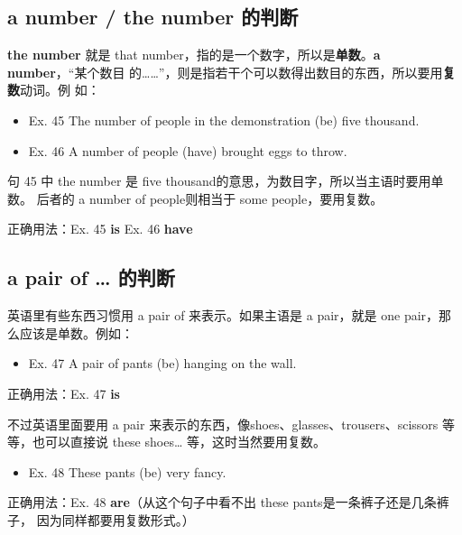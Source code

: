 \subsection{a number / the number 的判断}

\textbf{the number} 就是 that number，指的是一个数字，所以是\textbf{单数}。\textbf{a number}，“某个数目
的\ldots\ldots{}”，则是指若干个可以数得出数目的东西，所以要用\textbf{复数}动词。例
如：
\begin{mybox}

\begin{itemize}
\item   Ex. 45 The number of people in the demonstration (be) five thousand.
\item   Ex. 46 A number of people (have) brought eggs to throw.
\end{itemize}

句 45 中 the number 是 five thousand的意思，为数目字，所以当主语时要用单数。
后者的 a number of people则相当于 some people，要用复数。

\tcblower

正确用法：Ex. 45 \textbf{is} \qquad\quad Ex. 46 \textbf{have}
\end{mybox}

\subsection{a pair of \ldots{} 的判断}

英语里有些东西习惯用 a pair of 来表示。如果主语是 a pair，就是 one
pair，那么应该是单数。例如：

\begin{mybox}

\begin{itemize}
\item   Ex. 47 A pair of pants (be) hanging on the wall.
\end{itemize}

\tcblower

正确用法：Ex. 47 \textbf{is}
\end{mybox}

不过英语里面要用 a pair 来表示的东西，像shoes、glasses、trousers、scissors 等
等，也可以直接说 these shoes\ldots{} 等，这时当然要用复数。

\begin{mybox}
\begin{itemize}
\item   Ex. 48 These pants (be) very fancy.
\end{itemize}

\tcblower

正确用法：Ex. 48 \textbf{are}（从这个句子中看不出 these pants是一条裤子还是几条裤子，
因为同样都要用复数形式。）
\end{mybox}

